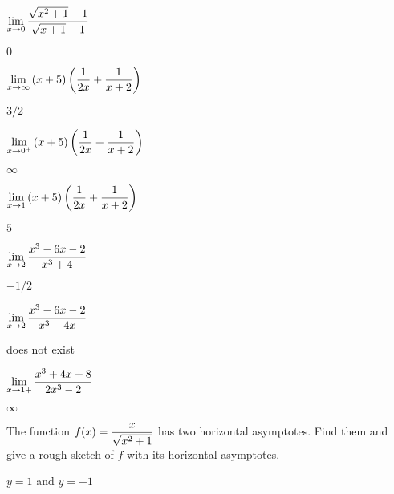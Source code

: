 \begin{exercises}
\begin{exercise} $\displaystyle\lim_{x\to0}{\sqrt{x^2+1}-1\over\sqrt{x+1}-1}$
\begin{answer} $0$
\end{answer}\end{exercise}

\begin{exercise} $\displaystyle\lim_{x\to\infty}{(x+5)\left({1\over 2x}+{1\over x+2}\right)}$
\begin{answer} $3/2$
\end{answer}\end{exercise}

\begin{exercise} $\displaystyle\lim_{x\to0^+}{(x+5)\left({1\over 2x}+{1\over x+2}\right)}$
\begin{answer} $\infty$
\end{answer}\end{exercise}

\begin{exercise} $\displaystyle\lim_{x\to1}{(x+5)\left({1\over 2x}+{1\over x+2}\right)}$
\begin{answer} $5$
\end{answer}\end{exercise}

\begin{exercise} $\displaystyle\lim_{x\to2}{x^3-6x-2\over x^3+4}$
\begin{answer} $-1/2$
\end{answer}\end{exercise}

\begin{exercise} $\displaystyle\lim_{x\to2}{x^3-6x-2\over x^3-4x}$
\begin{answer} does not exist
\end{answer}\end{exercise}

\begin{exercise} $\displaystyle\lim_{x\to1+}{x^3+4x+8\over 2x^3-2}$
\begin{answer} $\infty$
\end{answer}\end{exercise}

\endtwocol

\msk
\begin{exercise} The function $\displaystyle f(x) = {x\over\sqrt{x^2+1}}$ has two horizontal
 asymptotes.  Find them and give a rough sketch of $f$ with its horizontal
 asymptotes. 
\begin{answer} $y=1$ and $y=-1$
\end{answer}\end{exercise}

\end{exercises}

